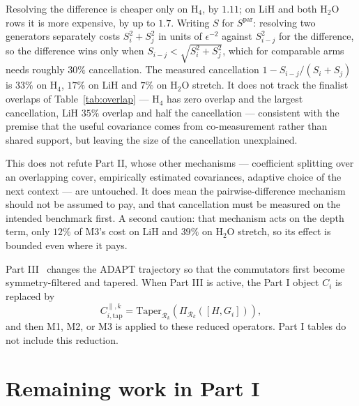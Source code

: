 \documentclass[10pt]{article}
\begin{document}
Resolving the difference is cheaper only on H$_4$, by $1.11$; on LiH and both H$_2$O rows it is more expensive, by up to $1.7$. Writing $S$ for $S^{\text{par}}$: resolving two generators separately costs $S_i^2+S_j^2$ in units of $\epsilon^{-2}$ against $S_{i-j}^2$ for the difference, so the difference wins only when $S_{i-j}<\sqrt{S_i^2+S_j^2}$, which for comparable arms needs roughly $30\%$ cancellation. The measured cancellation $1-S_{i-j}/(S_i+S_j)$ is $33\%$ on H$_4$, $17\%$ on LiH and $7\%$ on H$_2$O stretch. It does not track the finalist overlaps of Table~\ref{tab:overlap} --- H$_4$ has zero overlap and the largest cancellation, LiH $35\%$ overlap and half the cancellation --- consistent with the premise that the useful covariance comes from co-measurement rather than shared support, but leaving the size of the cancellation unexplained.

This does not refute Part II, whose other mechanisms --- coefficient splitting over an overlapping cover, empirically estimated covariances, adaptive choice of the next context --- are untouched. It does mean the pairwise-difference mechanism should not be assumed to pay, and that cancellation must be measured on the intended benchmark first. A second caution: that mechanism acts on the depth term, only $12\%$ of M3's cost on LiH and $39\%$ on H$_2$O stretch, so its effect is bounded even where it pays.

Part III~\cite{PartIII} changes the ADAPT trajectory so that the commutators first become symmetry-filtered and tapered. When Part III is active, the Part I object $C_i$ is replaced by
\begin{equation}
  C_{i,\mathrm{tap}}^{\parallel,k}
  =\mathrm{Taper}_{\mathcal R_k}\left(\Pi_{\mathcal R_k}([H,G_i])\right),
\end{equation}
and then M1, M2, or M3 is applied to these reduced operators. Part I tables do not include this reduction.

\section{Remaining work in Part I}
\label{sec:remaining}
\end{document}

